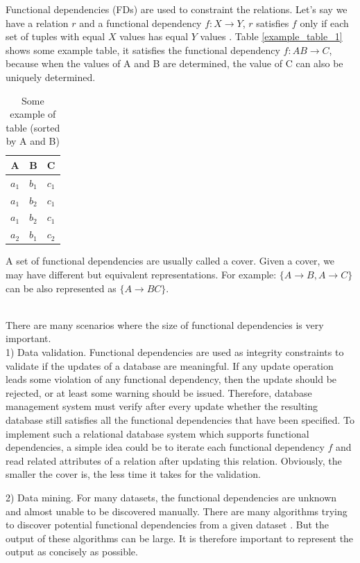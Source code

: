\documentclass[11pt]{book}
\begin{document}
Functional dependencies (FDs) are used to constraint the relations. Let's say we have a relation $r$ and a functional dependency $f: X \rightarrow Y$, $r$ satisfies $f$ only if each set of tuples with equal $X$ values has equal $Y$ values \cite{maier1983theory}. Table \ref{example_table_1} shows some example table, it satisfies the functional dependency $f: AB \to C$, because when the values of A and B are determined, the value of C can also be uniquely determined.

\begin{table}[H]
	\centering
	
	\begin{tabular}{ c c c }
		A     & B     & C \\
		\hline
		$a_1$ & $b_1$ & $c_1$ \\
		\hdashline
		$a_1$ & $b_2$ & $c_1$ \\ 
		$a_1$ & $b_2$ & $c_1$ \\
		\hdashline		
		$a_2$ & $b_1$ & $c_2$ \\
	\end{tabular}
	
	\caption{Some example of table (sorted by A and B)}
\end{table}

A set of functional dependencies are usually called a cover. Given a cover, we may have different but equivalent representations. For example: $\{ A \to B, A \to C \}$ can be also represented as $\{ A \to BC \}$.

~\\
There are many scenarios where the size of functional dependencies is very important.
~\\

1) Data validation. Functional dependencies are used as integrity constraints to validate if the updates of a database are meaningful. If any update operation leads some violation of any functional dependency, then the update should be rejected, or at least some warning should be issued. Therefore, database management system must verify after every update whether the resulting database still satisfies all the functional dependencies that have been specified. To implement such a relational database system which supports functional dependencies, a simple idea could be to iterate each functional dependency $f$ and read related attributes of a relation after updating this relation. Obviously, the smaller the cover is, the less time it takes for the validation.

2) Data mining. For many datasets, the functional dependencies are unknown and almost unable to be discovered manually. There are many algorithms trying to discover potential functional dependencies from a given dataset \cite{agarwal1994fast,huhtala1999tane,novelli2001fun,yao2008mining,lopes2000efficient,wyss2001fastfds}. But the output of these algorithms can be large. It is therefore important to represent the output as concisely as possible.
\end{document}
